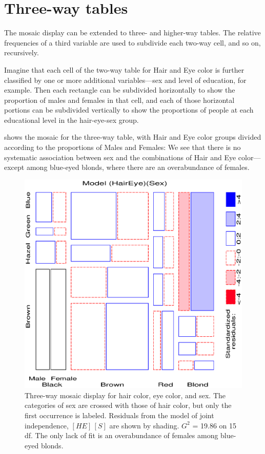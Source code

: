 \section{Three-way tables}\label{sec:mosaic-threeway}

The mosaic display can be extended to three- and higher-way tables.
The relative frequencies of a third variable are used to subdivide
each two-way cell, and so on, recursively.

Imagine that each
cell of the two-way table for Hair and Eye color is further
classified by one or more additional variables---sex and level of
education, for example.  Then each rectangle can be subdivided
horizontally to show the proportion of males and females in that
cell, and each of those horizontal portions can be subdivided
vertically to show the proportions of people at each educational
level in the hair-eye-sex group.

 shows the mosaic for the three-way table, with Hair and Eye color
groups divided according to the proportions of Males and Females:
We see that there is no systematic association between sex
and the combinations of Hair and Eye color---except among
blue-eyed blonds, where there are an overabundance of females.

\begin{figure}[!htb]
  \centering
  \includegraphics[scale=.6]{ch4/fig/mosaic35}
  \caption[Three-way mosaic, joint independence]{Three-way mosaic display for hair color, eye
color, and sex.
The categories of sex are crossed with those of
hair color, but only the first occurrence is labeled.
Residuals from
the model of joint independence, \([HE]\,  [S]\) are shown by
shading.
\(G^2\) = 19.86 on 15 df.
The only lack of fit is
an overabundance of females among blue-eyed blonds.}
\label{fig:mosaic35}
\end{figure}

